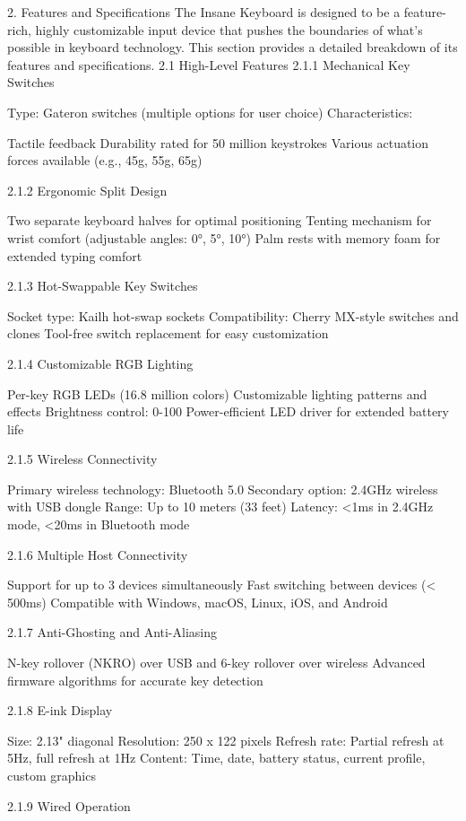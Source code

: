\documentclass[a4paper,11pt]{article}%
\begin{document}
2. Features and Specifications
The Insane Keyboard is designed to be a feature-rich, highly customizable input device that pushes the boundaries of what's possible in keyboard technology. This section provides a detailed breakdown of its features and specifications.
2.1 High-Level Features
2.1.1 Mechanical Key Switches

Type: Gateron switches (multiple options for user choice)
Characteristics:

Tactile feedback
Durability rated for 50 million keystrokes
Various actuation forces available (e.g., 45g, 55g, 65g)



2.1.2 Ergonomic Split Design

Two separate keyboard halves for optimal positioning
Tenting mechanism for wrist comfort (adjustable angles: 0°, 5°, 10°)
Palm rests with memory foam for extended typing comfort

2.1.3 Hot-Swappable Key Switches

Socket type: Kailh hot-swap sockets
Compatibility: Cherry MX-style switches and clones
Tool-free switch replacement for easy customization

2.1.4 Customizable RGB Lighting

Per-key RGB LEDs (16.8 million colors)
Customizable lighting patterns and effects
Brightness control: 0-100%
Power-efficient LED driver for extended battery life

2.1.5 Wireless Connectivity

Primary wireless technology: Bluetooth 5.0
Secondary option: 2.4GHz wireless with USB dongle
Range: Up to 10 meters (33 feet)
Latency: <1ms in 2.4GHz mode, <20ms in Bluetooth mode

2.1.6 Multiple Host Connectivity

Support for up to 3 devices simultaneously
Fast switching between devices (< 500ms)
Compatible with Windows, macOS, Linux, iOS, and Android

2.1.7 Anti-Ghosting and Anti-Aliasing

N-key rollover (NKRO) over USB and 6-key rollover over wireless
Advanced firmware algorithms for accurate key detection

2.1.8 E-ink Display

Size: 2.13" diagonal
Resolution: 250 x 122 pixels
Refresh rate: Partial refresh at 5Hz, full refresh at 1Hz
Content: Time, date, battery status, current profile, custom graphics

2.1.9 Wired Operation
\end{document}
